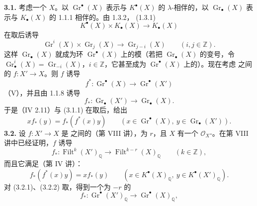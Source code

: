 \textbf{3.1.} 考虑一个   $X$。以 $\operatorname{Gr}^\bullet(X)$ 表示与 $K^\bullet(X)$ 的 $\lambda$-相伴的，以 $\operatorname{Gr}_\bullet(X)$ 表示与 $K_\bullet(X)$ 的 1.1.1 相伴的。由 1.3.2， (1.3.1)
\[K^\bullet(X)\times K_\bullet(X)\longrightarrow K_\bullet(X)\]
在取后诱导
\[\operatorname{Gr}^i(X)\times\operatorname{Gr}_j(X)\longrightarrow\operatorname{Gr}_{j-i}(X)\qquad(i,j\in\mathbb Z).\tag{3.1.1}\]
这样 $\operatorname{Gr}_\bullet(X)$ 就成为环 $\operatorname{Gr}^\bullet(X)$ 上的模（若把 $\operatorname{Gr}_\bullet(X)$ 的变号，令 $\operatorname{Gr}_\bullet^i(X)=\operatorname{Gr}_{-i}(X)$，$i\in\mathbb Z$，它甚至成为 $\operatorname{Gr}^\bullet(X)$ 上的）。现在考虑  之间的 $f:X'\longrightarrow X$。则 $f$ 诱导
\[f^*: \operatorname{Gr}^\bullet(X)\longrightarrow\operatorname{Gr}^\bullet(X')\]
（V），并且由 1.1.8 诱导
\[f_*:\operatorname{Gr}_\bullet(X')\longrightarrow\operatorname{Gr}_\bullet(X).\]
于是（IV 2.11）与 (3.1.1) 在取后，给出
\[x f_*(y)=f_*(f^*(x)y)\qquad(x\in\operatorname{Gr}^\bullet(X),\ y\in\operatorname{Gr}_\bullet(X')).\tag{3.1.2}\]
\textbf{3.2.} 设 $f:X'\longrightarrow X$ 是  之间的（第 VIII 讲），为 $r$，且 $X$ 有一个 $\mathcal O_X$-。在第 VIII 讲中已经证明，$f$ 诱导
\[f_*:\operatorname{Filt}^k(X')_{\mathbb Q}\longrightarrow\operatorname{Filt}^{k-r}(X)_{\mathbb Q}\qquad(k\in\mathbb Z),\tag{3.2.1}\]
而且它满足（第 IV 讲）：
\[f_*(f^*(x)y)=x f_*(y)\qquad(x\in K^\bullet(X)_{\mathbb Q},\ y\in K^\bullet(X')_{\mathbb Q}).\tag{3.2.2}\]
对 (3.2.1)、(3.2.2) 取，得到一个为 $-r$ 的
\[f_*:\operatorname{Gr}^\bullet(X')_{\mathbb Q}\longrightarrow\operatorname{Gr}^\bullet(X)_{\mathbb Q},\tag{3.2.3}\]
